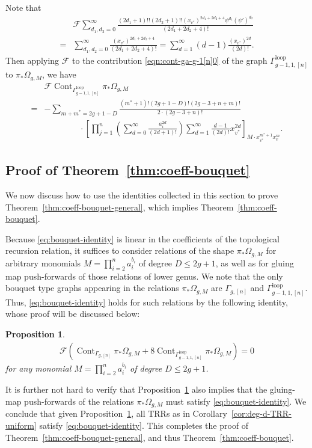 \documentclass[12pt,reqno]{amsart}
\DeclareMathOperator{\Cont}{Cont}
\newcommand{\Gammaloop}{\Gamma^\mathrm{loop}}
\theoremstyle{plain}
\newtheorem{proposition}[theorem]{Proposition}
\theoremstyle{definition}
\theoremstyle{remark}
\begin{document}
Note that
\begin{align*}
&\mathcal{F} \sum_{d_1,d_2=0}^{\infty}\frac{(2d_1+1)!!(2d_2+1)!!(x_{v^*})^{2d_1+2d_2+4}\psi^{d_1}(\psi')^{d_2}}{(2d_1+2d_2+4)!}
\\=&\sum_{d_1,d_2=0}^{\infty}\frac{(x_{v^*})^{2d_1+2d_2+4}}{(2d_1+2d_2+4)!}
=\sum_{d=1}^{\infty}(d-1)\frac{(x_{v^*})^{2d}}{(2d)!}.   
\end{align*}
Then applying $\mathcal F$ to the contribution \eqref{eqn:cont-ga-g-1[n]0} of the graph $\Gammaloop_{g-1, 1, [n]}$ to $\pi_* \Omega_{g, M}$, we have
\begin{align}\label{eqn:F-cont-ga-g-1[n]0} &\mathcal{F}\Cont_{\Gammaloop_{g-1,1,[n]}}\pi_*\Omega_{g,M}
\nonumber\\= &- \sum_{m + m^* = 2g + 1 - D} \frac{(m^* + 1)!(2g + 1 - D)!(2g - 3 + n + m)!}{2 \cdot (2g - 3 + n)!} 
\nonumber\\&\hspace{50pt}\cdot\left[\prod_{j = 1}^n \left(\sum_{d = 0}^\infty \frac{a_i^{2d}}{(2d + 1)!}\right) \sum_{d = 1}^\infty \frac{d - 1}{(2d)!} x_{v^*}^{2d}\right]_{M \cdot x_{v^*}^{m^* + 1} x_v^{m}}.
\end{align}

\subsection{Proof of Theorem~\ref{thm:coeff-bouquet}}
\label{ss:proof-bouquet}

We now discuss how to use the identities collected in this section to prove Theorem~\ref{thm:coeff-bouquet-general}, which implies Theorem~\ref{thm:coeff-bouquet}.

Because \eqref{eq:bouquet-identity} is linear in the coefficients of the topological recursion relation, it suffices to consider relations of the shape $\pi_{*}\Omega_{g,M}$ for arbitrary monomials $M =\prod_{i=2}^{n}a_i^{b_i}$ of degree $D\leq 2g+1$, as well as for gluing map push-forwards of those relations of lower genus.
We note that the only bouquet type graphs appearing in the relations $\pi_{*}\Omega_{g,M}$ are $\Gamma_{g, [n]}$ and $\Gammaloop_{g-1, 1, [n]}$.
Thus, \eqref{eq:bouquet-identity} holds for such relations by the following identity, whose proof will be discussed below:
\begin{proposition}\label{prop:1-loop-rel-M}
\begin{align*}
\mathcal{F}\left(
\Cont_{\Gamma_{g,[n]}}\pi_{*}\Omega_{g,M}+8\Cont_{\Gammaloop_{g-1,1,[n]}}\pi_{*}\Omega_{g,M}  \right) =0 
\end{align*}
for any monomial $M=\prod_{i=2}^{n}a_i^{b_i}$ of degree $D\leq 2g+1$.
\end{proposition}
It is further not hard to verify that Proposition~\ref{prop:1-loop-rel-M} also implies that the gluing-map push-forwards of the relations $\pi_{*}\Omega_{g,M}$ must satisfy \eqref{eq:bouquet-identity}.
We conclude that given Proposition~\ref{prop:1-loop-rel-M}, all TRRs as in Corollary~\ref{cor:deg-d-TRR-uniform} satisfy \eqref{eq:bouquet-identity}.
This completes the proof of Theorem~\ref{thm:coeff-bouquet-general}, and thus Theorem~\ref{thm:coeff-bouquet}.
\end{document}
